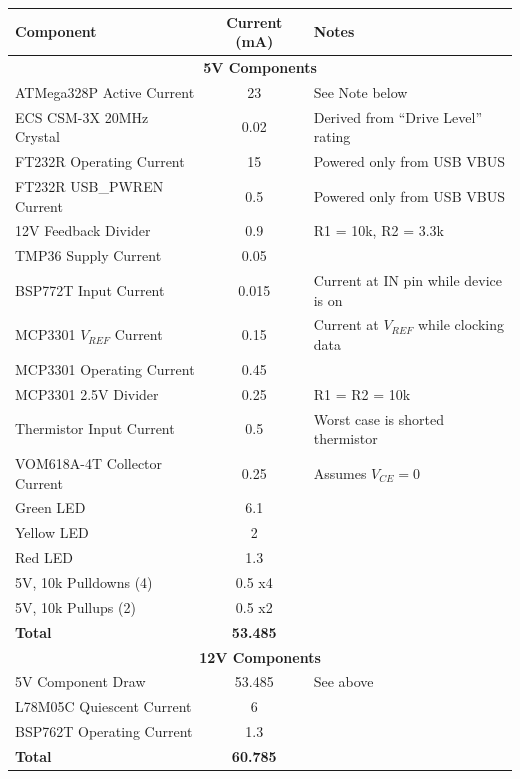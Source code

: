 \documentclass{article}
\begin{document}
\begin{center}
    \begin{tabular}{|l|c|l|}
        \hline
        Component & Current (mA) & Notes \\
        \hline
        \multicolumn{3}{|c|}{\textbf{5V Components}} \\
        \hline
        ATMega328P Active Current & 23 & See Note below \\
        ECS CSM-3X 20MHz Crystal & 0.02 & Derived from ``Drive Level'' rating \\
        FT232R Operating Current & 15 & Powered only from USB VBUS \\
        FT232R USB\_PWREN Current & 0.5 & Powered only from USB VBUS \\
        12V Feedback Divider & 0.9 & R1 = 10k\textOmega{}, R2 = 3.3k\textOmega{} \\
        TMP36 Supply Current & 0.05 & \\
        BSP772T Input Current & 0.015 & Current at IN pin while device is on \\
        MCP3301 $V_{REF}$ Current &  0.15 & Current at $V_{REF}$ while clocking data \\
        MCP3301 Operating Current & 0.45 & \\
        MCP3301 2.5V Divider & 0.25 & R1 = R2 = 10k\textOmega{} \\
        Thermistor Input Current & 0.5 & Worst case is shorted thermistor \\
        VOM618A-4T Collector Current & 0.25 & Assumes $V_{CE} = 0$ \\
        Green LED & 6.1 & \\
        Yellow LED & 2 & \\
        Red LED & 1.3  & \\
        5V, 10k\textOmega{} Pulldowns (4) & 0.5 x4 & \\
        5V, 10k\textOmega{} Pullups (2) & 0.5 x2 & \\
        \textbf{Total} & \textbf{53.485} & \\ 

        \hline
        \hline

        \multicolumn{3}{|c|}{\textbf{12V Components}} \\
        \hline
        5V Component Draw & 53.485 & See above \\
        L78M05C Quiescent Current & 6 & \\
        BSP762T Operating Current & 1.3 & \\
        \textbf{Total} & \textbf{60.785} & \\
        \hline
    \end{tabular}
\end{center}
\end{document}
